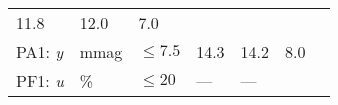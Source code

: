 \documentclass[DM, lsstdraft, toc]{lsstdoc}
\begin{document}
\begin{longtable}[]{@{}lllllll@{}}
\begin{minipage}[t]{0.12\columnwidth}
11.8\strut
\end{minipage} & \begin{minipage}[t]{0.12\columnwidth}\raggedright\strut
12.0\strut
\end{minipage} & \begin{minipage}[t]{0.12\columnwidth}\raggedright\strut
7.0\strut
\end{minipage} & \begin{minipage}[t]{0.17\columnwidth}\raggedright\strut
\strut
\end{minipage}\tabularnewline
\begin{minipage}[t]{0.12\columnwidth}\raggedright\strut
PA1: \emph{y}\strut
\end{minipage} & \begin{minipage}[t]{0.06\columnwidth}\raggedright\strut
mmag\strut
\end{minipage} & \begin{minipage}[t]{0.14\columnwidth}\raggedright\strut
\(\leq 7.5\)\strut
\end{minipage} & \begin{minipage}[t]{0.12\columnwidth}\raggedright\strut
14.3\strut
\end{minipage} & \begin{minipage}[t]{0.12\columnwidth}\raggedright\strut
14.2\strut
\end{minipage} & \begin{minipage}[t]{0.12\columnwidth}\raggedright\strut
8.0\strut
\end{minipage} & \begin{minipage}[t]{0.17\columnwidth}\raggedright\strut
\strut
\end{minipage}\tabularnewline
\begin{minipage}[t]{0.12\columnwidth}\raggedright\strut
PF1: \emph{u}\strut
\end{minipage} & \begin{minipage}[t]{0.06\columnwidth}\raggedright\strut
\%\strut
\end{minipage} & \begin{minipage}[t]{0.14\columnwidth}\raggedright\strut
\(\leq 20\)\strut
\end{minipage} & \begin{minipage}[t]{0.12\columnwidth}\raggedright\strut
---\strut
\end{minipage} & \begin{minipage}[t]{0.12\columnwidth}\raggedright\strut
---\strut
\end{minipage} & \begin{minipage}[t]{0.12\columnwidth}\raggedright\strut

\end{minipage}
\end{longtable}
\end{document}
